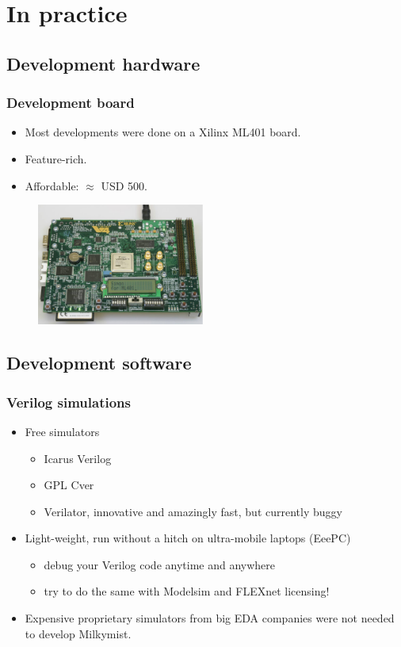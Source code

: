\documentclass{beamer}
\begin{document}
\section{In practice}
\frame
{
  \begin{center}
  \end{center}
}

\subsection{Development hardware}
\frame
{
  \frametitle{Development board}
  \begin{itemize}
  \item Most developments were done on a Xilinx ML401 board.
  \item Feature-rich.
  \item Affordable: $\approx$ USD 500.
  \end{itemize}
  \begin{figure}[H]
  \includegraphics[height=40mm]{ml401.eps}
  \end{figure}
}


\subsection{Development software}
\frame
{
  \frametitle{Verilog simulations}
  \begin{itemize}
  \item Free simulators
  \begin{itemize}
  \item Icarus Verilog
  \item GPL Cver
  \item Verilator, innovative and amazingly fast, but currently buggy
  \end{itemize}
  \item Light-weight, run without a hitch on ultra-mobile laptops (EeePC)
  \begin{itemize}
  \item debug your Verilog code anytime and anywhere
  \item try to do the same with Modelsim and FLEXnet licensing!
  \end{itemize}
  \item Expensive proprietary simulators from big EDA companies were not needed to develop Milkymist.
  \end{itemize}
}
\end{document}
